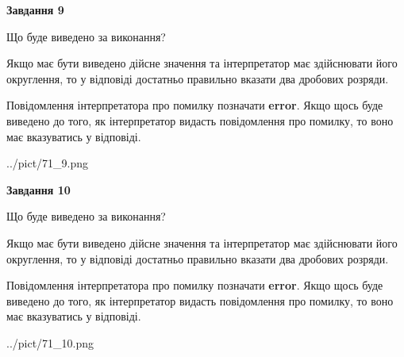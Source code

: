 \documentclass[12pt, ukrainian]{article}
\begin{document}
{\begin {Large}
{\begin {center}\textbf{Завдання 9}\end {center}}\par
Що буде виведено за виконання? \par

Якщо має бути виведено дійсне значення та інтерпретатор має здійснювати його округлення, 
то у відповіді достатньо правильно вказати два дробових розряди.

Повідомлення інтерпретатора про помилку позначати \textbf{error}.
Якщо щось буде виведено до того, як інтерпретатор видасть повідомлення про помилку, 
то воно має вказуватись у відповіді. \par

\begin{center}
	{../pict/71_9.png}
\end{center}
\newpage

{\begin {center}\textbf{Завдання 10}\end {center}}\par
Що буде виведено за виконання? \par

Якщо має бути виведено дійсне значення та інтерпретатор має здійснювати його округлення, 
то у відповіді достатньо правильно вказати два дробових розряди.

Повідомлення інтерпретатора про помилку позначати \textbf{error}.
Якщо щось буде виведено до того, як інтерпретатор видасть повідомлення про помилку, 
то воно має вказуватись у відповіді. \par

\begin{center}
	{../pict/71_10.png}
\end{center}
\newpage

\end {Large}}
\end{document}
